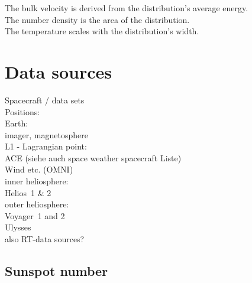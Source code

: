The bulk velocity is derived from the distribution's average energy.\\
The number density is the area of the distribution.\\
The temperature scales with the distribution's width.\\



\section{Data sources}

Spacecraft / data sets\\

Positions:\\
Earth:\\
	imager, magnetosphere\\
L1 - Lagrangian point:\\
	ACE (siehe auch space weather spacecraft Liste)\\
	Wind etc. (OMNI)\\
inner heliosphere:\\
	Helios~1 \& 2\\
outer heliosphere:\\
	Voyager~1 and 2\\
	Ulysses\\

also RT-data sources?\\


\subsection{Sunspot number}

